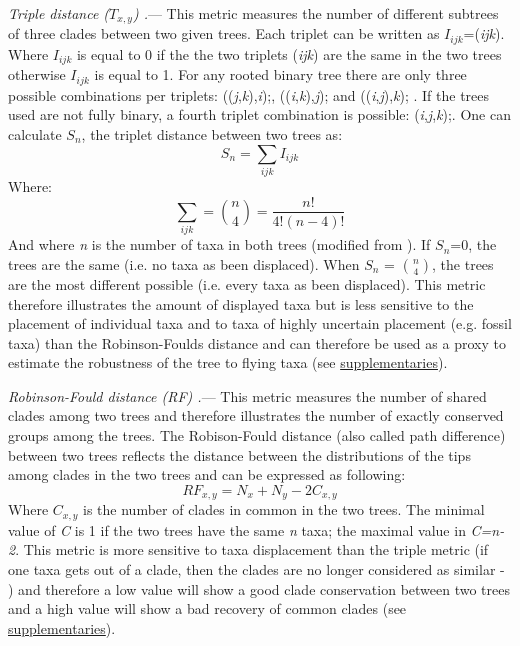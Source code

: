 \documentclass[12pt,letterpaper]{article}
\renewcommand{\subsubsection}[1]{%
\vspace{2ex}
\noindent
\textit{#1.}---}
\begin{document}
\subsubsection{Triple distance ($T_{x,y}$) \citep{dobson1975triplets}}
This metric measures the number of different subtrees of three clades between two given trees.
Each triplet can be written as $I_{ijk}$=(\textit{ijk}).
Where $I_{ijk}$ is equal to 0 if the the two triplets (\textit{ijk}) are the same in the two trees otherwise $I_{ijk}$ is equal to 1.
For any rooted binary tree there are only three possible combinations per triplets: ((\textit{j},\textit{k}),\textit{i});, ((\textit{i},\textit{k}),\textit{j}); and ((\textit{i},\textit{j}),\textit{k}); \citep{johnson1998}.
If the trees used are not fully binary, a fourth triplet combination is possible: (\textit{i},\textit{j},\textit{k});.
One can calculate $S_n$, the triplet distance between two trees as:
\begin{equation}
S_n = \sum_{ijk} I_{ijk}
\end{equation}
Where:
\begin{equation}
\sum_{ijk} = \binom{n}{4} = \frac{n!}{4!(n-4)!}
\end{equation}
And where \textit{n} is the number of taxa in both trees (modified from \citet{critchlowthe1996}).
If $S_n$=0, the trees are the same (i.e. no taxa as been displaced). When $S_n$ = $\binom{n}{4}$, the trees are the most different possible (i.e. every taxa as been displaced).
This metric therefore illustrates the amount of displayed taxa but is less sensitive to the placement of individual taxa and to taxa of highly uncertain placement (e.g. fossil taxa) than the Robinson-Foulds distance \citep{critchlowthe1996,johnson1998,wiensmissing2003} and can therefore be used as a proxy to estimate the robustness of the tree to flying taxa (see \hyperref[supplementaries]{supplementaries}).

\subsubsection{Robinson-Fould distance (\textit{RF}) \citep{RF1981}}
This metric measures the number of shared clades among two trees and therefore illustrates the number of exactly conserved groups among the trees.
The Robison-Fould distance (also called path difference) between two trees reflects the distance between the distributions of the tips among clades in the two trees \citep{RF1981} and can be expressed as following:
\begin{equation}
RF_{x,y} = N_{x} + N_{y} - 2C_{x,y}
\end{equation}
Where $C_{x,y}$ is the number of clades in common in the two trees.
The minimal value of \textit{C} is 1 if the two trees have the same \textit{n} taxa; the maximal value in \textit{C=n-2}.
This metric is more sensitive to taxa displacement than the triple metric (if one taxa gets out of a clade, then the clades are no longer considered as similar - \citet{critchlowthe1996,johnson1998,wiensmissing2003}) and therefore a low value will show a good clade conservation between two trees and a high value will show a bad recovery of common clades (see \hyperref[supplementaries]{supplementaries}).
\end{document}

